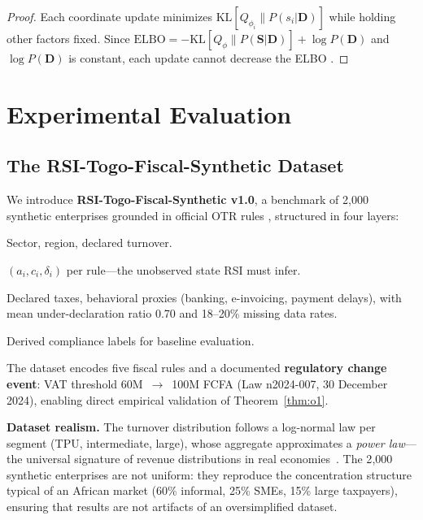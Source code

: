 \documentclass[letterpaper]{article}
\begin{document}
\begin{proof}
Each coordinate update minimizes $\mathrm{KL}[Q_{\phi_i} \|
P(s_i | \mathbf{D})]$ while holding other factors fixed. Since
$\mathrm{ELBO} = -\mathrm{KL}[Q_\phi \| P(\mathbf{S}|\mathbf{D})] +
\log P(\mathbf{D})$ and $\log P(\mathbf{D})$ is constant, each update
cannot decrease the ELBO \citep{blei2017variational}.
\end{proof}

\section{Experimental Evaluation}
\label{sec:experiments}

\subsection{The RSI-Togo-Fiscal-Synthetic Dataset}

We introduce \textbf{RSI-Togo-Fiscal-Synthetic v1.0}, a benchmark of
2{,}000 synthetic enterprises grounded in official OTR rules
\citep{otr2024lf}, structured in four layers:

\begin{description}[leftmargin=1.5em]
  \item[Enterprise features] Sector, region, declared turnover.
  \item[Latent ground truth] $(a_i, c_i, \delta_i)$ per rule---the
        unobserved state RSI must infer.
  \item[Noisy observations] Declared taxes, behavioral proxies
        (banking, e-invoicing, payment delays), with mean
        under-declaration ratio 0.70 and 18--20\% missing data rates.
  \item[Binary labels] Derived compliance labels for baseline evaluation.
\end{description}

\noindent The dataset encodes five fiscal rules and a documented
\textbf{regulatory change event}: VAT threshold 60M~$\to$~100M FCFA
(Law n\textdegree{}2024-007, 30 December 2024), enabling direct
empirical validation of Theorem~\ref{thm:o1}.

\noindent\textbf{Dataset realism.} The turnover distribution follows
a log-normal law per segment (TPU, intermediate, large), whose
aggregate approximates a \emph{power law}---the universal signature
of revenue distributions in real economies~\citep{gabaix2009power}.
The 2{,}000 synthetic enterprises are not uniform: they reproduce the
concentration structure typical of an African market (60\% informal,
25\% SMEs, 15\% large taxpayers), ensuring that results are not
artifacts of an oversimplified dataset.
\end{document}
